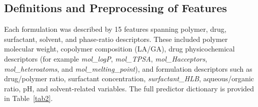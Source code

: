 \documentclass[10pt]{NSP1}
\begin{document}
\subsection{Definitions and Preprocessing of Features}

Each formulation was described by 15 features spanning polymer, drug, surfactant, solvent, and
phase-ratio descriptors. These included polymer molecular weight, copolymer composition (LA/GA),
drug physicochemical descriptors (for example \textit{mol\_logP}, \textit{mol\_TPSA},
\textit{mol\_Hacceptors}, \textit{mol\_heteroatoms}, and \textit{mol\_melting\_point}), and
formulation descriptors such as drug/polymer ratio, surfactant concentration,
\textit{surfactant\_HLB}, aqueous/organic ratio, pH, and solvent-related variables. The full
predictor dictionary is provided in Table~\ref{tab2}.
\end{document}

